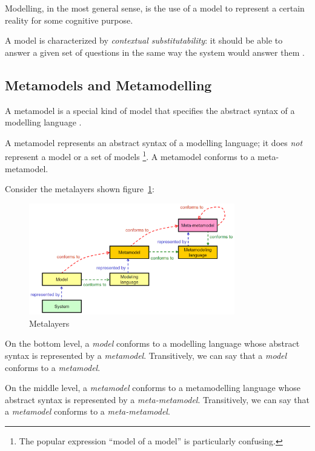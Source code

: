 Modelling, in the most general sense, is the use of a model to represent a certain reality for some cognitive purpose.

A model is characterized by \textit{contextual substitutability}: it should be able to answer a given set of questions in the same way the system would answer them \cite{Genova09}.

\subsection{Metamodels and Metamodelling}

A metamodel is a special kind of model that specifies the abstract syntax of a modelling language \cite{OMG-MDA-Foundation-Model}.

A metamodel represents an abstract syntax of a modelling language; it does \textit{not} represent a model or a set of models
\footnote{The popular expression ``model of a model'' is particularly confusing.}.
A metamodel conforms to a meta-metamodel.

Consider the metalayers shown figure~\ref{figure:metalayers}:

\begin{figure}[h]
	\centering
	\includegraphics[width=0.8\textwidth]{images/metalayers.png}
	\caption{Metalayers \cite{Genova09}}
	\label{figure:metalayers}
\end{figure}

On the bottom level, a \textit{model} conforms to a modelling language whose abstract syntax is represented by a \textit{metamodel}.
Transitively, we can say that a \textit{model} conforms to a \textit{metamodel}.

On the middle level, a \textit{metamodel} conforms to a metamodelling language whose abstract syntax is represented by a \textit{meta-metamodel}.
Transitively, we can say that a \textit{metamodel} conforms to a \textit{meta-metamodel}.

